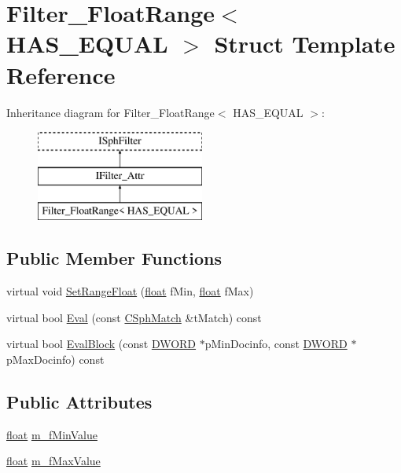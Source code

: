 \hypertarget{structFilter__FloatRange}{\section{Filter\-\_\-\-Float\-Range$<$ H\-A\-S\-\_\-\-E\-Q\-U\-A\-L $>$ Struct Template Reference}
\label{structFilter__FloatRange}
}
Inheritance diagram for Filter\-\_\-\-Float\-Range$<$ H\-A\-S\-\_\-\-E\-Q\-U\-A\-L $>$\-:\begin{figure}[H]
\begin{center}
\leavevmode
\includegraphics[height=3.000000cm]{structFilter__FloatRange}
\end{center}
\end{figure}
\subsection*{Public Member Functions}
\begin{DoxyCompactItemize}
\item 
virtual void \hyperlink{structFilter__FloatRange_aa80fea6ff09bd53dc833282e30defd9a}{Set\-Range\-Float} (\hyperlink{sphinxexpr_8cpp_a0e0d0739f7035f18f949c2db2c6759ec}{float} f\-Min, \hyperlink{sphinxexpr_8cpp_a0e0d0739f7035f18f949c2db2c6759ec}{float} f\-Max)
\item 
virtual bool \hyperlink{structFilter__FloatRange_a5bbbdac4a9e694d2f8d60036bada1c47}{Eval} (const \hyperlink{classCSphMatch}{C\-Sph\-Match} \&t\-Match) const 
\item 
virtual bool \hyperlink{structFilter__FloatRange_a43b50347fd827b605458f304582abc6e}{Eval\-Block} (const \hyperlink{sphinxstd_8h_a798af1e30bc65f319c1a246cecf59e39}{D\-W\-O\-R\-D} $\ast$p\-Min\-Docinfo, const \hyperlink{sphinxstd_8h_a798af1e30bc65f319c1a246cecf59e39}{D\-W\-O\-R\-D} $\ast$p\-Max\-Docinfo) const 
\end{DoxyCompactItemize}
\subsection*{Public Attributes}
\begin{DoxyCompactItemize}
\item 
\hyperlink{sphinxexpr_8cpp_a0e0d0739f7035f18f949c2db2c6759ec}{float} \hyperlink{structFilter__FloatRange_a9143c50f194304390bdc827cff235604}{m\-\_\-f\-Min\-Value}
\item 
\hyperlink{sphinxexpr_8cpp_a0e0d0739f7035f18f949c2db2c6759ec}{float} \hyperlink{structFilter__FloatRange_a567268cdafc8985023f1b4ad2bff6f38}{m\-\_\-f\-Max\-Value}
\end{DoxyCompactItemize}
